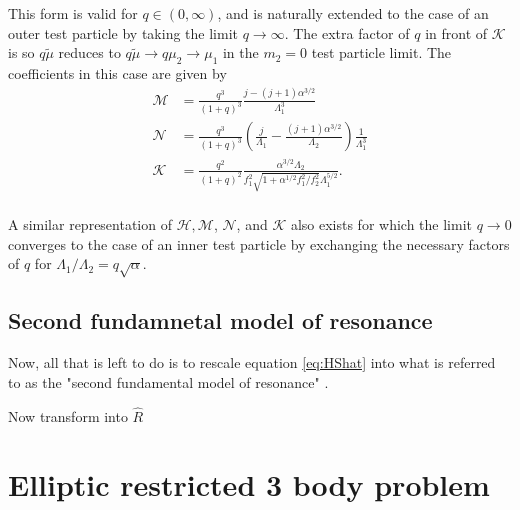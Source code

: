 \documentclass[usenatbib]{mnras}
\newcommand{\note}[1]{{\color{red} \large #1 }}
\begin{document}
\noindent This form is valid for \(q\in (0,\infty)\), and is
naturally extended to the case of an outer test particle by taking the
limit \(q\to\infty\).  The extra factor of \(q\) in front of \(\mathcal K\)
is so \(q\tilde\mu\) reduces to \(q\tilde\mu\to q\mu_2 \to \mu_1\) in the
\(m_2=0\) test particle limit.  The coefficients in this case are given
by
\begin{align}
  \mathcal M
  &= \frac{q^3}{(1+q)^3}\frac{j-(j+1)\alpha^{3/2}}{\Lambda_1^3}\\
  \mathcal N
  &= \frac{q^3}{(1+q)^3}\left(
    \frac{j}{\Lambda_1} - \frac{(j+1)\alpha^{3/2}}{\Lambda_2}
    \right)\frac{1}{\Lambda_1^3}\\
  \mathcal K
  &= \frac{q^2}{(1+q)^2}
    \frac{\alpha^{3/2}\Lambda_2}{f_1^2\sqrt{1+\alpha^{1/2}f_1^2/f_2^2}\Lambda_1^{5/2}}.\\
\end{align}

A similar representation of \(\mathcal H, \mathcal M\), \(\mathcal N\),
and \(\mathcal{K}\) also exists for which the limit \(q\to 0\) converges
to the case of an inner test particle by exchanging the necessary
factors of \(q\) for \(\Lambda_1/\Lambda_2 = q\sqrt\alpha\).


\subsection{Second fundamnetal model of resonance}
\label{sec:org57620f0}
Now, all that is left to do is to rescale equation \eqref{eq:HShat}
into what is referred to as
the "second fundamental model of resonance" \citep{henrard_second_1983}.



\note{
Now transform into $\hat R$
}


\section{Elliptic restricted 3 body problem}
\label{sec:orgd9f726b}

\twocolumn


\end{document}
